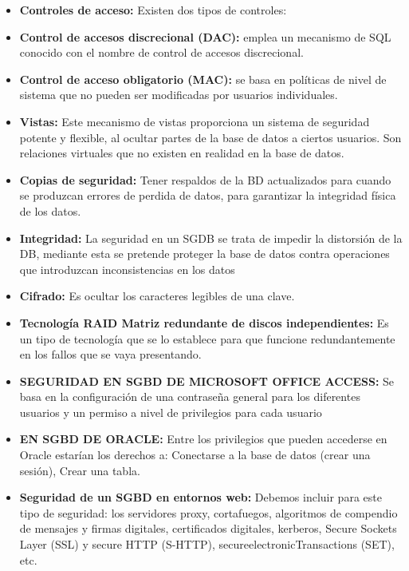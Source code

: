 \documentclass[conference]{IEEEtran}
\begin{document}
\begin{itemize}
\item \textbf{Controles de acceso:}
Existen dos tipos de controles: 
\item \textbf{Control de accesos discrecional (DAC): } emplea un mecanismo de SQL conocido con el nombre de control de accesos discrecional.
\item \textbf{Control de acceso obligatorio (MAC):}
se basa en políticas de nivel de sistema que no pueden ser modificadas por usuarios individuales.
\item \textbf{Vistas:}
Este mecanismo de vistas proporciona un sistema de seguridad potente y flexible, al ocultar partes de la base de datos a ciertos usuarios. 
Son relaciones virtuales que no existen en realidad en la base de datos.

\item \textbf{Copias de seguridad: }
Tener respaldos de la BD actualizados para cuando se produzcan errores de perdida de datos,  para garantizar la integridad física de los datos.
\item \textbf{Integridad: }
La seguridad en un SGDB se trata de impedir la distorsión de la DB, mediante esta se pretende proteger la base de datos contra operaciones que introduzcan inconsistencias en los datos
\item \textbf{Cifrado: }
Es ocultar los caracteres legibles de una clave.

\item \textbf{Tecnología RAID Matriz redundante de discos independientes: }
Es un tipo de tecnología que se lo establece para que funcione redundantemente en los fallos que se vaya presentando.

\item \textbf{SEGURIDAD EN SGBD DE MICROSOFT OFFICE ACCESS: }
Se basa en la configuración de una contraseña general para los diferentes usuarios y un permiso a nivel de privilegios para cada usuario

\item \textbf{EN SGBD DE ORACLE: }
Entre los privilegios que pueden accederse en Oracle estarían los derechos a: Conectarse a la base de datos (crear una sesión), Crear una tabla.
\item \textbf{Seguridad de un SGBD en entornos web: }
Debemos incluir para este tipo de seguridad: los servidores proxy, cortafuegos, algoritmos de compendio de mensajes y firmas digitales, certificados digitales, kerberos, Secure Sockets Layer (SSL) y secure HTTP (S-HTTP), secureelectronicTransactions (SET), etc.


\end{itemize}
\end{document}
